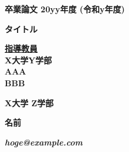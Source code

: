 \pagestyle{empty}

\begin{center}

\vspace{5cm}

\textbf{\Large 卒業論文 20yy年度 (令和y年度)}

\vspace{2cm}

\textbf{\LARGE タイトル}

\vspace{3cm}

\textbf{\underline{\large 指導教員}}\\
\textbf{X大学Y学部}\\
\vspace{0.5cm}
\textbf{\Large AAA}\\
\textbf{\Large BBB}\\

\vspace{5cm}

\textbf{\LARGE X大学 \LARGE Z学部}

\vspace{.5em}

\textbf{\LARGE 名前}

\vspace{.3em}

\textbf{\it hoge@example.com}



\newpage

\end{center}

\pagestyle{plain}
